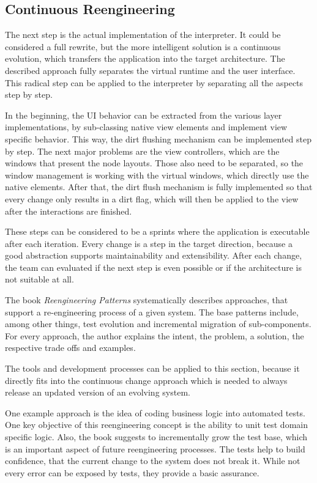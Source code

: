 \subsection{Continuous Reengineering}
\label{continuous-reengineering}

The next step is the actual implementation of the interpreter.
It could be considered a full rewrite, but the more intelligent solution is a continuous evolution, which transfers the application into the target architecture.
The described approach fully separates the virtual runtime and the user interface.
This radical step can be applied to the interpreter by separating all the aspects step by step.

In the beginning, the UI behavior can be extracted from the various layer implementations, by sub-classing native view elements and implement view specific behavior.
This way, the dirt flushing mechanism can be implemented step by step.
The next major problems are the view controllers, which are the windows that present the node layouts.
Those also need to be separated, so the window management is working with the virtual windows, which directly use the native elements.
After that, the dirt flush mechanism is fully implemented so that every change only results in a dirt flag, which will then be applied to the view after the interactions are finished.

These steps can be considered to be a sprints where the application is executable after each iteration.
Every change is a step in the target direction, because a good abstraction supports maintainability and extensibility.
After each change, the team can evaluated if the next step is even possible or if the architecture is not suitable at all.

The book \textit{Reengineering Patterns} \cite{demeyer_object-oriented_2002} systematically describes approaches, that support a re-engineering process of a given system.
The base patterns include, among other things, test evolution and incremental migration of sub-components.
For every approach, the author explains the intent, the problem, a solution, the respective trade offs and examples.

The tools and development processes can be applied to this section, because it directly fits into the continuous change approach which is needed to always release an updated version of an evolving system.

One example approach is the idea of coding business logic into automated tests.
One key objective of this reengineering concept is the ability to unit test domain specific logic.
Also, the book suggests to incrementally grow the test base, which is an important aspect of future reengineering processes.
The tests help to build confidence, that the current change to the system does not break it.
While not every error can be exposed by tests, they provide a basic assurance.

